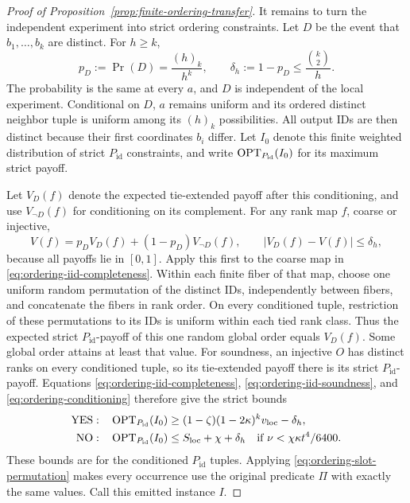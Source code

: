 \begin{proof}[Proof of Proposition~\ref{prop:finite-ordering-transfer}]
It remains to turn the independent experiment into strict ordering
constraints.  Let \(D\) be the event that \(b_1,\ldots,b_k\) are
distinct.  For \(h\ge k\),
\begin{equation}
 p_D:=\Pr(D)=\frac{(h)_k}{h^k},\qquad
 \delta_h:=1-p_D\le\frac{\binom{k}{2}}h.
\label{eq:ordering-distinct-probability}
\end{equation}
The probability is the same at every \(a\), and \(D\) is independent
of the local experiment.  Conditional on \(D\), \(a\) remains uniform
and its ordered distinct neighbor tuple is uniform among its
\((h)_k\) possibilities.  All output IDs are then distinct because
their first coordinates \(b_i\) differ.  Let \(I_0\) denote this finite
weighted distribution of strict \(P_{\mathrm{id}}\) constraints, and write
\(\operatorname{OPT}_{P_{\mathrm{id}}}(I_0)\) for its maximum strict payoff.

Let \(V_D(f)\) denote the expected tie-extended payoff after this
conditioning, and use \(V_{\neg D}(f)\) for conditioning on its
complement.  For any rank map \(f\), coarse or injective,
\begin{equation}
 V(f)=p_DV_D(f)+(1-p_D)V_{\neg D}(f),
 \qquad |V_D(f)-V(f)|\le\delta_h,
\label{eq:ordering-conditioning}
\end{equation}
because all payoffs lie in \([0,1]\).  Apply this first to the coarse
map in \eqref{eq:ordering-iid-completeness}.  Within each finite fiber
of that map, choose one uniform random permutation of the distinct
IDs, independently between fibers, and concatenate the fibers in
rank order.  On every conditioned tuple, restriction of these
permutations to its IDs is uniform within each tied rank class.
Thus the expected strict \(P_{\mathrm{id}}\)-payoff of this one random global
order equals \(V_D(f)\).  Some global order attains at least that
value.  For soundness, an injective \(O\) has distinct ranks on every
conditioned tuple, so its tie-extended payoff there is its strict
\(P_{\mathrm{id}}\)-payoff.  Equations \eqref{eq:ordering-iid-completeness},
\eqref{eq:ordering-iid-soundness}, and \eqref{eq:ordering-conditioning}
therefore give the strict bounds
\begin{equation}
\begin{aligned}
 \mathrm{YES}:\quad&
 \operatorname{OPT}_{P_{\mathrm{id}}}(I_0)\ge(1-\zeta)(1-2\kappa)^k v_{\mathrm{loc}}-\delta_h,\\
 \mathrm{NO}:\quad&
 \operatorname{OPT}_{P_{\mathrm{id}}}(I_0)\le S_{\mathrm{loc}}+\chi+\delta_h
 \quad\text{if }\nu<\chi\kappa t^4/6400.
\end{aligned}
\label{eq:ordering-conditioned-gap}
\end{equation}
These bounds are for the conditioned \(P_{\mathrm{id}}\) tuples.  Applying
\eqref{eq:ordering-slot-permutation} makes every occurrence use the
original predicate \(\Pi\) with exactly the same values.  Call this
emitted instance \(I\).


\end{proof}
